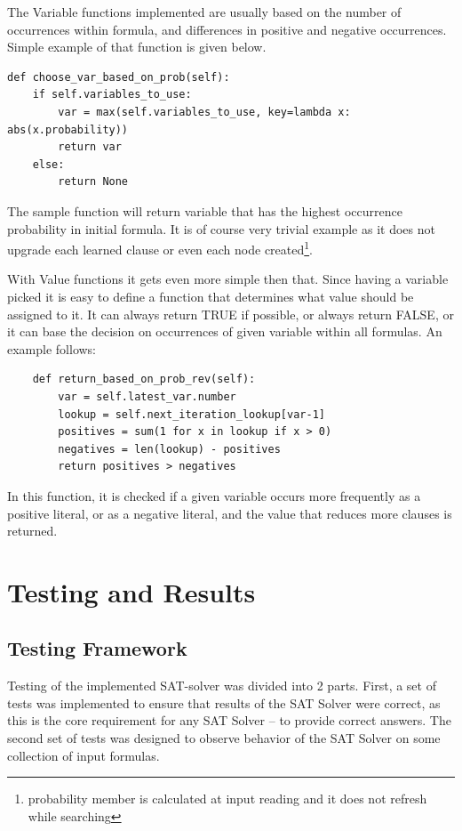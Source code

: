 \documentclass[12pt,english,pdflatex]{aghdpl}
\begin{document}
The Variable functions implemented are usually based on the number of occurrences
within formula, and differences in positive and negative occurrences.
Simple example of that function is given below.

\begin{lstlisting}
def choose_var_based_on_prob(self):
    if self.variables_to_use:
        var = max(self.variables_to_use, key=lambda x: abs(x.probability))
        return var
    else:
        return None
\end{lstlisting}
The sample function will return variable that has the highest occurrence probability
in initial formula. It is of course very trivial example as it does
not upgrade each learned clause or even each node created\footnote{probability member is calculated at input reading and it does not refresh while searching}.

With Value functions it gets even more simple then that. Since  having a
variable picked it is easy to define a function that determines what
value should be assigned to it. It can always return TRUE if possible,
or always return FALSE, or it can base the decision on occurrences of given
variable within all formulas. An example follows:
\begin{lstlisting}
    def return_based_on_prob_rev(self):
        var = self.latest_var.number
        lookup = self.next_iteration_lookup[var-1]
        positives = sum(1 for x in lookup if x > 0)
        negatives = len(lookup) - positives
        return positives > negatives
\end{lstlisting}
In this function, it is checked if a given variable occurs more frequently  as a positive
literal, or as a negative literal, and the value that reduces
more clauses is returned.




\chapter{Testing and Results}
\label{chap:Results}

\section{Testing Framework}
\label{sec:Framework}

Testing of the implemented SAT-solver was divided into 2 parts. First, a set of
tests was implemented to ensure that results of the SAT Solver were
correct, as this is the core requirement for any SAT Solver -- to provide
correct answers. The second set of tests was designed to observe behavior
of the SAT Solver on some collection of input formulas.
\end{document}
